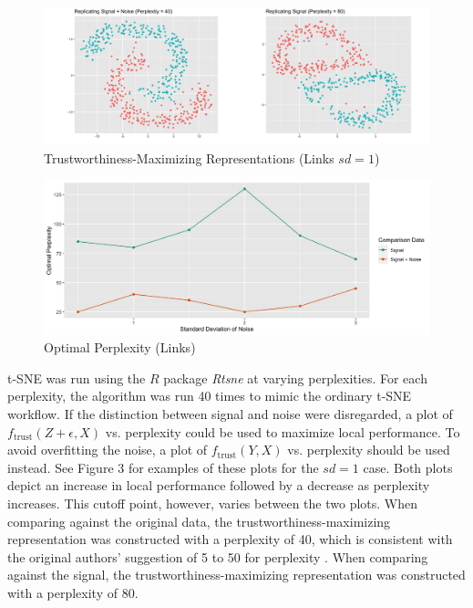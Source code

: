 \documentclass{article}
\begin{document}
\renewcommand{\thefigure}{4}
\begin{figure}[t]
\centering
\includegraphics[scale=0.26]{best_rep_links}
\caption{Trustworthiness-Maximizing Representations (Links $sd = 1$)}
\end{figure}

\renewcommand{\thefigure}{5}
\begin{figure}[b]
\centering
\includegraphics[scale=0.38]{optimal_perp_links}
\caption{Optimal Perplexity (Links)}
\end{figure}

t-SNE was run using the $R$ package \textit{Rtsne} \cite{Rtsne} at varying perplexities. For each perplexity, the algorithm was run 40 times to mimic the ordinary t-SNE workflow. If the distinction between signal and noise were disregarded, a plot of $f_\textrm{trust}(Z + \epsilon, X)$ vs. perplexity could be used to maximize local performance. To avoid overfitting the noise, a plot of $f_\textrm{trust}(Y, X)$ vs. perplexity should be used instead. See Figure 3 for examples of these plots for the $sd = 1$ case. Both plots depict an increase in local performance followed by a decrease as perplexity increases. This cutoff point, however, varies between the two plots. When comparing against the original data, the trustworthiness-maximizing representation was constructed with a perplexity of 40, which is consistent with the original authors' suggestion of 5 to 50 for perplexity \cite{t-SNE}. When comparing against the signal, the trustworthiness-maximizing representation was constructed with a perplexity of 80. 
\end{document}

